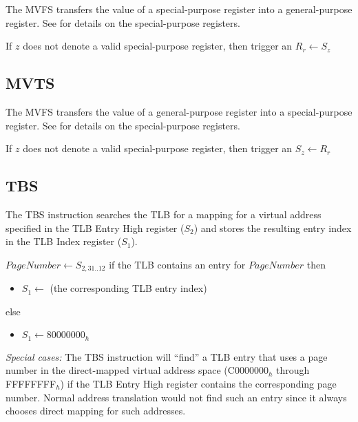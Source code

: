 The MVFS transfers the value of a special-purpose register into a general-purpose register. See  for details on the special-purpose registers.


\begin{effectize}
\priveffect
\effect If $z$ does not denote a valid special-purpose register, then trigger an 
\effect $R_r \leftarrow S_z$
\end{effectize}

\subsection{MVTS}

The MVFS transfers the value of a general-purpose register into a special-purpose register. See  for details on the special-purpose registers.


\begin{effectize}
\priveffect
\effect If $z$ does not denote a valid special-purpose register, then trigger an 
\effect $S_z \leftarrow R_r$
\end{effectize}

\subsection{TBS}

The TBS instruction searches the TLB for a mapping for a virtual address specified in the TLB Entry High register ($S_2$) and stores the resulting entry index in the TLB Index register ($S_1$).


\begin{effectize}
\priveffect
\effect $PageNumber \leftarrow S_{2,31..12}$
\effect if the TLB contains an entry for $PageNumber$ then
\begin{itemize}
\item[] $S_1 \leftarrow$ (the corresponding TLB entry index)
\end{itemize}
\effect else
\begin{itemize}
\item[] $S_1 \leftarrow 80000000_{h}$
\end{itemize}
\end{effectize}

\textit{Special cases:} The TBS instruction will ``find'' a TLB entry that uses a page number in the direct-mapped virtual address space (C0000000$_h$ through FFFFFFFF$_h$) if the TLB Entry High register contains the corresponding page number. Normal address translation would not find such an entry since it always chooses direct mapping for such addresses.

